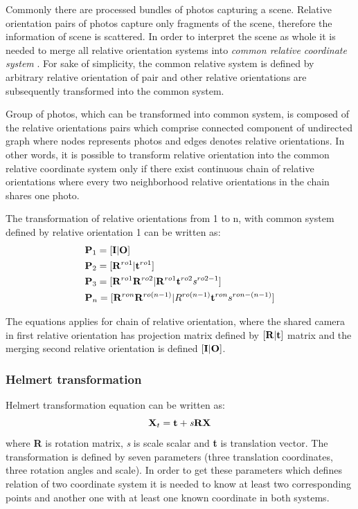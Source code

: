 \documentclass[a4paper,12pt]{article}
\newcommand{\ematr}[1]{
{\bf #1}
}
\newcommand{\evect}[1]{
{\bf #1}
}
\newcommand{\escal}[1]{
{\it #1}
}
\newcommand{\term}[1]{
{\it #1}
}
\begin{document}
Commonly there are processed bundles of photos capturing a scene. Relative orientation pairs of photos capture only fragments of the scene, 
therefore the information of scene is scattered.  
In order to interpret the scene as whole it is needed to merge all relative orientation systems into \term{common relative coordinate system}.
For sake of simplicity, the common relative system is defined by arbitrary relative orientation of pair and other 
relative orientations are subsequently transformed into the common system. 

Group of photos, which can be transformed into common system, is composed of the relative orientations pairs
which comprise connected component of undirected graph where nodes represents  photos and edges denotes  relative orientations. 
In other words, it is possible to transform relative orientation into the common relative coordinate system only if there 
exist continuous chain of relative orientations where every two neighborhood relative orientations in the chain shares one photo.

The transformation of relative orientations from 1 to n, with common system defined by relative orientation 1 can be written as: 
\begin{equation}
\label{eq:comm_rel}
\begin{split}
&\ematr{P}_{1} = [\ematr{I}|\evect{O}] \\
&\ematr{P}_{2} = [\ematr{R}^{ro1}|\evect{t}^{ro1}] \\
&\ematr{P}_{3} = [\ematr{R}^{ro1} \ematr{R}^{ro2}| \ematr{R}^{ro1} \evect{t}^{ro2} \escal{s}^{ro2-1}] \\
&\ematr{P}_{n} = [\ematr{R}^{ron} \ematr{R}^{ro(n - 1)}| R^{ro(n - 1)} \evect{t}^{ron} {s}^{ron- (n-1)}] \\
\end{split}
\end{equation}


The equations applies for chain of relative orientation, where the shared camera in first relative orientation has 
projection matrix defined by $[\ematr{R}|\evect{t}]$ matrix and the merging second relative orientation is 
defined $[\ematr{I}|\ematr{O}]$.

\subsubsection{Helmert transformation}
\label{sec:helmert}

Helmert transformation equation can be written as:
\begin{equation}
\ematr{X}_{t} = \evect{t} + \escal{s}\ematr{R}\evect{X} \\
\end{equation}
where \ematr{R} is rotation matrix, \escal{s} is scale scalar and  \evect{t} is translation vector.
The transformation is defined by seven parameters (three translation coordinates, three rotation angles and scale).
In order to get these parameters which defines relation of two coordinate system it is needed to know at least two corresponding points and  another one with 
at least one known coordinate in both systems. 
\end{document}
